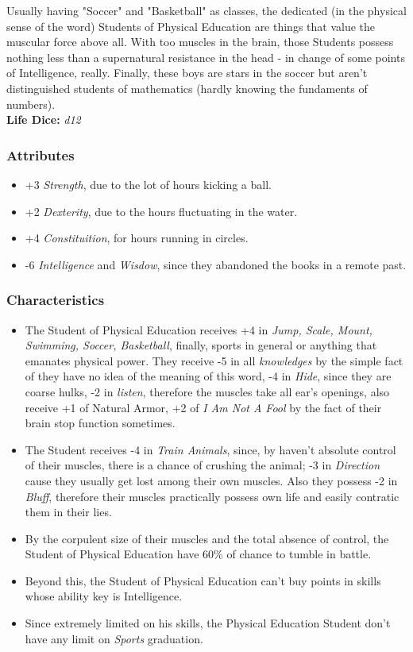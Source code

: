 \documentclass[ letterpaper,12pt]{article}
\begin{document}
Usually having "Soccer" and "Basketball" as classes, the dedicated (in the physical sense of the word) Students of Physical Education are things that value the muscular force above all.  With too muscles in the brain, those Students possess nothing less than a supernatural resistance in the head - in change of some points of Intelligence, really.  Finally, these boys are stars in the soccer but aren't distinguished students of mathematics (hardly knowing the fundaments of numbers).\\

{\bf Life Dice:} {\it d12}

\subsubsection{Attributes}
\begin{itemize}
\item{+3 {\it Strength}, due to the lot of hours kicking a ball.}
\item{+2 {\it Dexterity}, due to the hours fluctuating in the water.}
\item{+4 {\it Constituition}, for hours running in circles.}
\item{-6 {\it Intelligence} and {\it Wisdow}, since they abandoned the books in a remote past.}
\end{itemize}

\subsubsection{Characteristics}
\begin{itemize}
\item{The   Student   of   Physical   Education receives  +4  in  {\it Jump,   Scale,   Mount, Swimming,  Soccer,  Basketball},  finally, sports  in  general  or   anything that emanates physical power. They receive -5 in all {\it knowledges} by the simple fact of they have no idea of the meaning of this word, -4 in {\it Hide}, since they are coarse hulks, -2 in {\it listen}, therefore  the muscles take all ear's openings, also receive +1 of Natural Armor, +2 of {\it I Am Not A Fool} by the fact of their brain stop function sometimes.}
\item{The  Student  receives  -4 in {\it Train Animals}, since, by haven't absolute control of their muscles,  there  is  a chance of crushing the animal; -3 in {\it Direction} cause they usually get lost among their own muscles. Also  they possess -2 in {\it Bluff}, therefore their muscles practically possess own life and easily contratic them in their lies.}
\item{By  the  corpulent size of their muscles and the total absence of control, the Student of Physical Education have 60\% of chance to tumble in battle.}
\item{Beyond this, the Student of Physical Education can't buy points in skills whose ability key is Intelligence.}
\item{Since extremely limited on his skills, the Physical Education Student don't have any limit on {\it Sports} graduation.}
\end{itemize}
\end{document}
